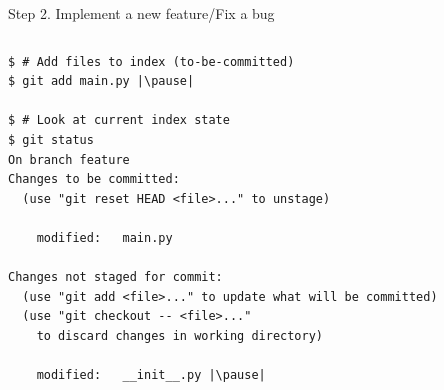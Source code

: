 \begin{frame}[fragile]{Step 2. Implement a new feature/Fix a bug}
\begin{columns}
	\begin{column}{0.6\textwidth}
	\begin{lstlisting}
$ # Add files to index (to-be-committed)
$ git add main.py |\pause|

$ # Look at current index state
$ git status
On branch feature
Changes to be committed:
  (use "git reset HEAD <file>..." to unstage)

	modified:   main.py

Changes not staged for commit:
  (use "git add <file>..." to update what will be committed)
  (use "git checkout -- <file>..." 
	to discard changes in working directory)

	modified:   __init__.py |\pause|


\end{lstlisting}
\end{column}
\end{columns}
\end{frame}

